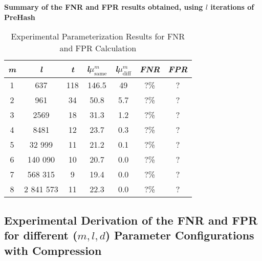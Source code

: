 \textbf{Summary of the FNR and FPR results obtained, using $l$ iterations of PreHash}
\begin{table}[htbp] 
    \centering
    \begin{tabular}{|c|c|c|c|c|c|c|}
        \hline
        \textit{m} & \textit{l} & \textit{t} & \textit{l}\(\mu_{\text{same}}^m\) & \textit{l}\(\mu_{\text{diff}}^m\) & \textit{FNR} & \textit{FPR} \\
        \hline
        1 & 637 & 118 & 146.5 & 49 & ?\% & ? \\
        2 & 961 & 34 & 50.8 & 5.7 & ?\% & ? \\
        3 & 2569 & 18 & 31.3 & 1.2 & ?\% & ? \\
        4 & 8481 & 12 & 23.7 & 0.3 & ?\% & ? \\
        5 & 32 999 & 11 & 21.2 & 0.1 & ?\% & ? \\
        6 & 140 090 & 10 & 20.7 & 0.0 & ?\% & ? \\
        7 & 568 315 & 9 & 19.4 & 0.0 & ?\% & ? \\
        8 & 2 841 573 & 11 & 22.3 & 0.0 & ?\% & ? \\
        \hline
    \end{tabular}
    \caption{Experimental Parameterization Results for FNR and FPR Calculation}
    \label{tab:experimental_parameterization}
\end{table}

\newpage
\subsection{Experimental Derivation of the FNR and FPR for different (\(m, l, d\)) Parameter Configurations with Compression}

